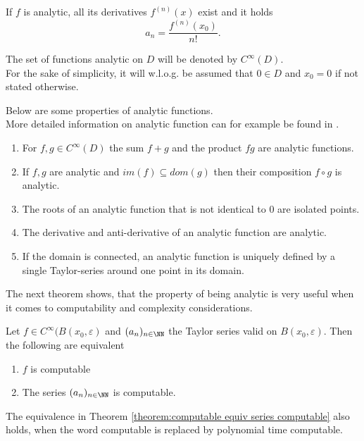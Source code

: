 		If $f$ is analytic, all its derivatives $f^{(n)}(x)$ exist and it holds
		$$ a_n = \frac{f^{(n)}(x_0)}{n!}. $$    

		The set of functions analytic on $D$ will be denoted by $C^\infty(D)$. \\		
		For the sake of simplicity, it will w.l.o.g. be assumed that $0 \in D$ and $x_0 = 0$ if not stated otherwise.
		
		Below are some properties of analytic functions.\\
    More detailed information on analytic function can for example be found in \cite{krantz2002primer}. 

		\begin{enumerate}
			\item For $f,g \in C^\infty(D)$ the sum  $f+g$ and the product $fg$ are analytic functions.
			\item If $f, g$ are analytic and $im(f) \subseteq dom(g)$ then their composition $f \circ g$ is analytic.
			\item The roots of an analytic function that is not identical to $0$ are isolated points.
			\item The derivative and anti-derivative of an analytic function are analytic.
			\item If the domain is connected, an analytic function is uniquely defined by a single Taylor-series around one point in its domain.
		\end{enumerate}

    The next theorem shows, that the property of being analytic is very useful when it comes to computability and complexity considerations.

    \begin{theorem}\label{theorem:computable equiv series computable} 
      Let $f \in C^\infty(B(x_0, \varepsilon)$ and $(a_n)_{n \in \NN}$ the Taylor series
      valid on $B(x_0, \varepsilon)$. 
			Then the following are equivalent
			\begin{enumerate}
				\item $f$ is computable 
				\item The series $(a_n)_{n \in \NN}$ is computable. 
 			\end{enumerate}
		\end{theorem}
    \begin{theorem}\label{theorem:computable equiv series computable polytime}
			The equivalence in Theorem \ref{theorem:computable equiv series computable} also holds, when the word computable is replaced by polynomial time computable.
		\end{theorem}
		
